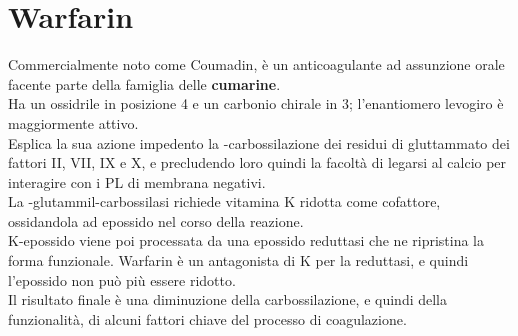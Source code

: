 \documentclass[a4paper, 12pt]{article}
\begin{document}
\section{Warfarin}
Commercialmente noto come Coumadin, è un anticoagulante ad assunzione orale facente parte della famiglia delle \textbf{cumarine}.\\
Ha un ossidrile in posizione 4 e un carbonio chirale in 3; l'enantiomero levogiro è maggiormente attivo.\\
Esplica la sua azione impedento la \textgamma-carbossilazione dei residui di gluttammato dei fattori II, VII, IX e X, e precludendo loro quindi la facoltà di legarsi al calcio per interagire con i PL di membrana negativi.\\
La \textgamma-glutammil-carbossilasi richiede vitamina K ridotta come cofattore, ossidandola ad epossido nel corso della reazione.\\
K-epossido viene poi processata da una epossido reduttasi che ne ripristina la forma funzionale. Warfarin è un antagonista di K per la reduttasi, e quindi l'epossido non può più essere ridotto.\\
Il risultato finale è una diminuzione della carbossilazione, e quindi della funzionalità, di alcuni fattori chiave del processo di coagulazione.
\end{document}
